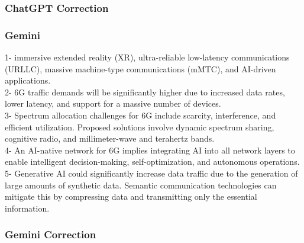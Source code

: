 \subsubsection{ChatGPT Correction}
\begin{tcolorbox}[breakable]
    
\end{tcolorbox}
\subsubsection{Gemini}
\begin{tcolorbox}[breakable]
1- immersive extended reality (XR), ultra-reliable low-latency communications (URLLC), massive machine-type communications (mMTC), and AI-driven applications.\\
2- 6G traffic demands will be significantly higher due to increased data rates, lower latency, and support for a massive number of devices.\\
3- Spectrum allocation challenges for 6G include scarcity, interference, and efficient utilization. Proposed solutions involve dynamic spectrum sharing, cognitive radio, and millimeter-wave and terahertz bands.\\
4- An AI-native network for 6G implies integrating AI into all network layers to enable intelligent decision-making, self-optimization, and autonomous operations.\\
5- Generative AI could significantly increase data traffic due to the generation of large amounts of synthetic data. Semantic communication technologies can mitigate this by compressing data and transmitting only the essential information.\\
\end{tcolorbox}
\subsubsection{Gemini Correction}
\begin{tcolorbox}[breakable]
    
\end{tcolorbox}
